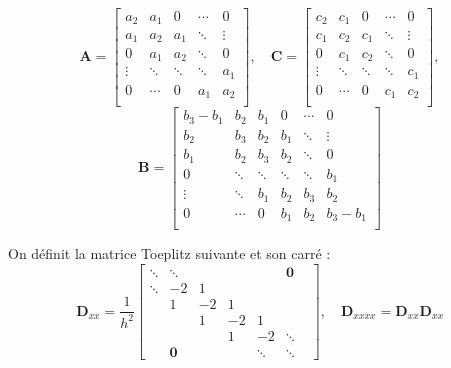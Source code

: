 \documentclass[a4,12pt]{article}
\newcommand{\A}{\mathbf{A}}
\newcommand{\B}{\mathbf{B}}
\newcommand{\C}{\mathbf{C}}
\newcommand{\D}{\mathbf{D}}
\begin{document}
  \[
    \A=
    \begin{bmatrix} 
      a_2 & a_1 & 0 & \cdots & 0 \\ 
      a_1 & a_2 & a_1 & \ddots & \vdots \\ 
      0 & a_1 & a_2 & \ddots  & 0 \\ 
      \vdots & \ddots & \ddots & \ddots  & a_1 \\ 
      0 & \cdots & 0 & a_1 & a_2  \\
    \end{bmatrix},\quad 
    \C=
    \begin{bmatrix} 
      c_2 & c_1 & 0 & \cdots & 0 \\ 
      c_1 & c_2 & c_1 & \ddots & \vdots \\ 
      0 & c_1 & c_2 & \ddots  & 0 \\ 
      \vdots & \ddots & \ddots & \ddots  & c_1 \\ 
      0 & \cdots & 0 & c_1 & c_2  \\
    \end{bmatrix},
  \]
  \[
    \B=
    \begin{bmatrix}
      b_3-b_1 & b_2 & b_1 & 0 & \cdots & 0  \\ 
      b_2 & b_3 & b_2 & b_1 & \ddots & \vdots \\  
      b_1 & b_2 & b_3 & b_2 & \ddots & 0 \\ 
      0 & \ddots & \ddots & \ddots & \ddots &b_1\\ 
      \vdots & \ddots & b_1 & b_2 & b_3 & b_2  \\ 
      0 & \cdots &  0 & b_1 & b_2 & b_3-b_1  \\
    \end{bmatrix}
  \]

  On définit la matrice Toeplitz suivante et son carré : 
  \[
    \D_{xx}=\frac{1}{h^2}
    \begin{bmatrix}
      \ddots & \ddots & & & & \mathbf{0}  & \\
      \ddots & -2 & 1 & & & & \\ 
      & 1 & -2 & 1 & & & \\ 
      & & 1 & -2 & 1 & & \\ 
      & & & 1 & -2 & \ddots \\ 
      & \mathbf{0} & & & \ddots & \ddots
    \end{bmatrix}, 
    \quad \D_{xxxx}=\D_{xx}\D_{xx}
  \]

\end{document}
